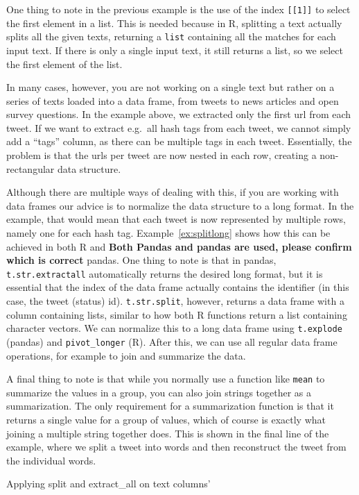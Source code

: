 One thing to note in the previous example is the use of the index \verb|[[1]]| to select the first element in a list.
This is needed because in R, splitting a text actually splits all the given texts, returning a \texttt{list} containing all the matches for each input text.
If there is only a single input text, it still returns a list, so we select the first element of the list.

In many cases, however, you are not working on a single text but rather on a series of texts loaded into a data frame,
from tweets to news articles and open survey questions.
In the example above, we extracted only the first url from each tweet.
If we  want to extract e.g.\ all hash tags from each tweet, we cannot simply add a ``tags'' column,
as there can be multiple tags in each tweet.
Essentially, the problem is that the urls per tweet are now nested in each row,
creating a non-rectangular data structure.

Although there are multiple ways of dealing with this,
if you are working with data frames our advice is to normalize the data structure to a long format.
In the example, that would mean that each tweet is now represented by multiple rows,
namely one for each hash tag.
Example~\ref{ex:splitlong} shows how this can be achieved in both R and {\bf Both Pandas and pandas are used, please confirm which is correct} pandas.
One thing to note is that in pandas,
\verb|t.str.extractall| automatically returns the desired long format,
but it is essential that the index of the data frame actually contains the identifier (in this case, the tweet (status) id).
\verb|t.str.split|, however, returns a data frame with a column containing lists,
similar to how both R functions return a list containing character vectors.
We can normalize this to a long data frame using \texttt{t.explode} (pandas) and \texttt{pivot\_longer} (R).
After this, we can use all regular data frame operations, for example to join and summarize the data.

A final thing to note is that  while you normally use a function like \texttt{mean} to summarize the values in a group,
you can also join strings together as a summarization.
The only requirement for a summarization function is that it returns a single value for a group of values,
which of course is exactly what joining a multiple string together does.
This is shown in the final line of the example, where we split a tweet into words and then reconstruct the tweet from the individual words.



\begin{ccsexample}
  \caption{Applying split and extract\_all on text columns'}\label{ex:splitlong}
\end{ccsexample}




